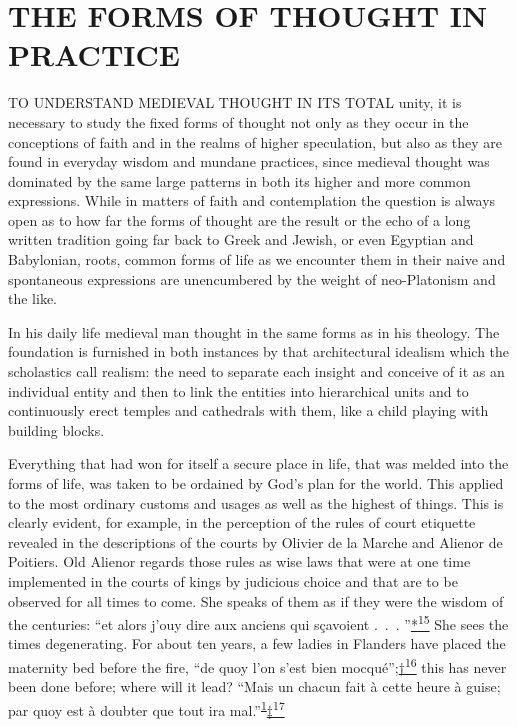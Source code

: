 \chapter{THE FORMS OF THOUGHT IN PRACTICE}

TO UNDERSTAND MEDIEVAL THOUGHT IN ITS TOTAL unity, it is necessary to
study the fixed forms of thought not only as they occur in the
conceptions of faith and in the realms of higher speculation, but also
as they are found in everyday wisdom and mundane practices, since
medieval thought was dominated by the same large patterns in both its
higher and more common expressions. While in matters of faith and
contemplation the question is always open as to how far the forms of
thought are the result or the echo of a long written tradition going far
back to Greek and Jewish, or even Egyptian and Babylonian, roots, common
forms of life as we encounter them in their naive and spontaneous
expressions are unencumbered by the weight of neo-Platonism and the
like.

In his daily life medieval man thought in the same forms as in his
theology. The foundation is furnished in both instances by that
architectural idealism which the scholastics call realism: the need to
separate each insight and conceive of it as an individual entity and
then to link the entities into hierarchical units and to continuously
erect temples and cathedrals with them, like a child playing with
building blocks.

Everything that had won for itself a secure place in life, that was
melded into the forms of life, was taken to be ordained by God's plan
for the world. This applied to the most ordinary customs and usages as
well as the highest of things. This is clearly evident, for example, in
the perception of the rules of court etiquette revealed in the
descriptions of the courts by Olivier de la Marche and Alienor de
Poitiers. Old Alienor regards those rules as wise laws that were at one
time implemented in the courts of kings by judicious choice and that are
to be observed for all times to come. She speaks of them as if they were
the wisdom of the centuries: ``et alors j'ouy
\protect\hypertarget{18_Chapter_Eleven__THE_FORMS_OF_THO.xhtmlux5cux23page_269}{}{}dire
aux anciens qui sçavoient .~.~.
''\protect\hypertarget{18_Chapter_Eleven__THE_FORMS_OF_THO.xhtmlux5cux23id_2333}{\protect\hyperlink{23_NOTES.xhtmlux5cux23id_2334}{*\textsuperscript{15}}}
She sees the times degenerating. For about ten years, a few ladies in
Flanders have placed the maternity bed before the fire, ``de quoy l'on
s'est bien
mocqué'';\protect\hypertarget{18_Chapter_Eleven__THE_FORMS_OF_THO.xhtmlux5cux23id_2335}{\protect\hyperlink{23_NOTES.xhtmlux5cux23id_2336}{†\textsuperscript{16}}}
this has never been done before; where will it lead? ``Mais un chacun
fait à cette heure à guise; par quoy est à doubter que tout ira
mal.''\textsuperscript{\protect\hypertarget{18_Chapter_Eleven__THE_FORMS_OF_THO.xhtmlux5cux23id_629}{\protect\hyperlink{23_NOTES.xhtmlux5cux23id_630}{1}}}\protect\hypertarget{18_Chapter_Eleven__THE_FORMS_OF_THO.xhtmlux5cux23id_2337}{\protect\hyperlink{23_NOTES.xhtmlux5cux23id_2338}{‡\textsuperscript{17}}}


